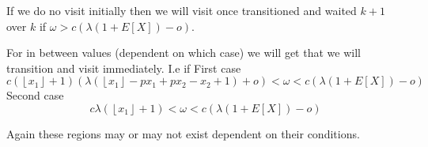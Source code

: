 \documentclass[a4paper,10pt]{article}
\newcommand{\floor}[1]{\left \lfloor #1 \right \rfloor}
\theoremstyle{definition}
\theoremstyle{definition}
\theoremstyle{remark}
\theoremstyle{definition}
\begin{document}
If we do no visit initially then we will visit once transitioned and waited $k+1$ over $k$ if $\omega > c (\lambda (1+E[X])-o)$.

For in between values (dependent on which case) we will get that we will transition and visit immediately.
I.e if
First case
\begin{equation}
c(\floor{x_{1}}+1)(\lambda (\floor{x_{1}}-px_{1}+px_{2}-x_{2}+1)+ o) < \omega < c (\lambda (1+E[X])-o) 
\end{equation}
Second case
\begin{equation}
c \lambda (\floor{x_{1}}+1) < \omega < c (\lambda (1+E[X])-o)
\end{equation}

Again these regions may or may not exist dependent on their conditions.
\end{document}
